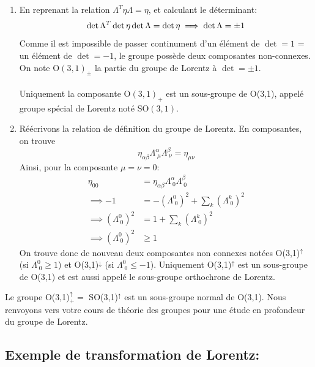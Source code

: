 \begin{enumerate}
    \item En reprenant la relation $\Lambda ^{T} \eta \Lambda = \eta$, et calculant le déterminant:
    \begin{equation}
        \det \Lambda^{T} \det \eta \det\Lambda = \det \eta \\
        \implies \det\Lambda = \pm 1
    \end{equation}
    Comme il est impossible de passer continument d'un élément de $\det =1$ = un élément de $\det = -1$, le groupe possède deux composantes non-connexes. On note O$(3,1)_\pm$ la partie du groupe de Lorentz à $\det = \pm 1$.\\
    \\
    Uniquement la composante O$(3,1)_+$ est un sous-groupe de O(3,1), appelé groupe spécial de Lorentz noté SO$(3,1)$. \\

    
    \item Réécrivons la relation de définition du groupe de Lorentz. En composantes, on trouve
    \begin{equation}
        \eta_{\alpha \beta} \Lambda_{\;\mu}^{\alpha} \Lambda_{\; \nu}^{\beta} = \eta_{\mu \nu}
    \end{equation}
    Ainsi, pour la composante $\mu = \nu =0$:
    \begin{align}
        \eta_{0 0} &= \eta_{\alpha \beta} \Lambda_{\;0}^{\alpha} \Lambda_{\;0}^{\beta} \\
        \implies -1 &= -(\Lambda_{\;0}^{0})^2 + \sum_{k}(\Lambda_{\;0}^{k})^2\\
        \implies (\Lambda_{\;0}^{0})^2 &= 1 + \sum_{k}(\Lambda_{\;0}^{k})^2\\
        \implies (\Lambda_{\;0}^{0})^2 &\geq 1
    \end{align}
    On trouve donc de nouveau deux composantes non connexes notées O(3,1)$^\uparrow$ (si $\Lambda_{\;0}^{0} \geq 1$) et O(3,1)$^\downarrow$ (si $\Lambda_{\;0}^{0} \leq - 1$). Uniquement O(3,1)$^\uparrow$ est un sous-groupe de O(3,1) et est aussi appelé le sous-groupe orthochrone de Lorentz.
\end{enumerate}
Le groupe O(3,1)$^\uparrow_+ =$ SO(3,1)$^\uparrow$ est un sous-groupe normal de O(3,1). Nous renvoyons vers votre cours de théorie des groupes pour une étude en profondeur du groupe de Lorentz.
\subsection{Exemple de transformation de Lorentz:}

